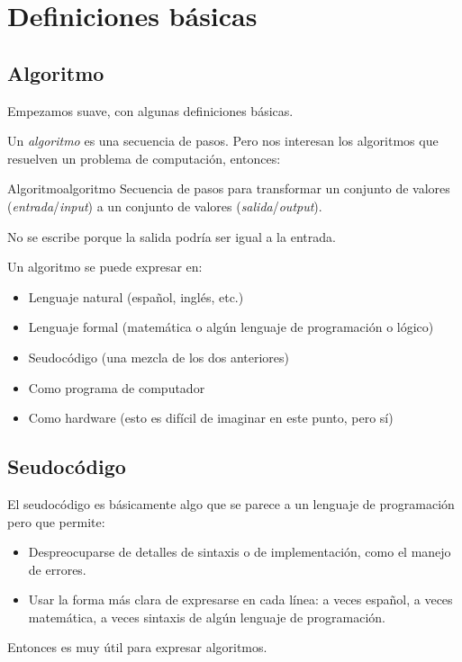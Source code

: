 \section{Definiciones básicas}

\subsection{Algoritmo}

Empezamos suave, con algunas definiciones básicas.

Un \emph{algoritmo} es una secuencia de pasos. Pero nos interesan los algoritmos que resuelven un problema de computación, entonces:

\begin{definicion}{Algoritmo}{algoritmo}
Secuencia de pasos para transformar un conjunto de valores (\emph{entrada}/\emph{\textit{input}}) a un conjunto de valores (\emph{salida}/\emph{\textit{output}}).
\end{definicion}
No se escribe  porque la salida podría ser igual a la entrada.

Un algoritmo se puede expresar en:
\begin{itemize}
  \item Lenguaje natural (español, inglés, etc.)
  \item Lenguaje formal (matemática o algún lenguaje de programación o lógico)
  \item Seudocódigo (una mezcla de los dos anteriores)
  \item Como programa de computador
  \item Como hardware (esto es difícil de imaginar en este punto, pero sí)
\end{itemize}

\subsection{Seudocódigo}

El seudocódigo es básicamente algo que se parece a un lenguaje de programación pero que permite:
\begin{itemize}
  \item Despreocuparse de detalles de sintaxis o de implementación, como el manejo de errores.
  \item Usar la forma más clara de expresarse en cada línea: a veces español, a veces matemática, a veces sintaxis de algún lenguaje de programación.
\end{itemize}
Entonces es muy útil para expresar algoritmos.

